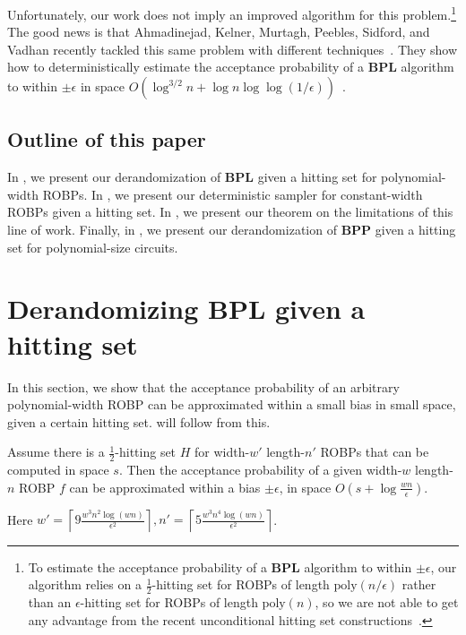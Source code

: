 \documentclass{toc}
\begin{document}
Unfortunately, our work does not imply an improved algorithm for this problem.\footnote{To estimate the acceptance probability of a $\mathbf{BPL}$ algorithm to within $\pm \epsilon$, our algorithm relies on a $\frac{1}{2}$-hitting set for ROBPs of length $\text{poly}(n/\epsilon)$ rather than an $\epsilon$-hitting set for ROBPs of length $\text{poly}(n)$, so we are not able to get any advantage from the recent unconditional hitting set constructions~\cite{BCG20,HZ20,CL20,CDRSTS21,PV21,Hoz21}.} The good news is that Ahmadinejad, Kelner, Murtagh, Peebles, Sidford, and Vadhan recently tackled this same problem with different techniques~\cite{AKMPSV20}. They show how to deterministically estimate the acceptance probability of a $\mathbf{BPL}$ algorithm to within $\pm \epsilon$ in space $O(\log^{3/2} n + \log n \log \log(1/\epsilon))$~\cite{AKMPSV20}.

\subsection{Outline of this paper}

In , we present our derandomization of $\mathbf{BPL}$ given a hitting set for polynomial-width ROBPs. In , we present our deterministic sampler for constant-width ROBPs given a hitting set. In , we present our theorem on the limitations of this line of work. Finally, in , we present our derandomization of $\mathbf{BPP}$ given a hitting set for polynomial-size circuits.

\section{Derandomizing $\mathbf{BPL}$ given a hitting set}
\label{sec:polywidth}

In this section, we show that the acceptance probability of an arbitrary polynomial-width ROBP can be approximated within a small bias in small space, given a certain hitting set.
 will follow from this.

\begin{theorem} \label{thm:HSGDerandROBP}
Assume there is a $\frac{1}{2}$-hitting set $H$  for width-$w'$ length-$n'$ ROBPs that can be computed in space $s$. Then the acceptance probability of a given width-$w$  length-$n$ ROBP $f$ can be approximated within a bias $\pm \epsilon$, in space $O(s+\log \frac{wn}{\epsilon})$.

Here $w'= \left \lceil 9 \frac{w^3 n^2  \log (wn) }{\epsilon^2} \right\rceil, n' = \left \lceil 5\frac{w^3n^4  \log (wn) }{\epsilon^2} \right \rceil$.
\end{theorem}
\end{document}
